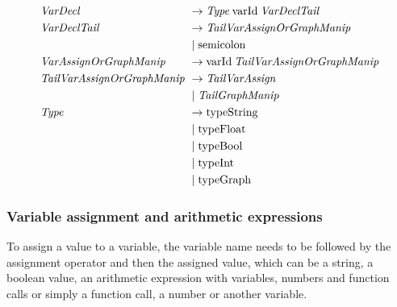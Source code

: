 \begin{align*}
    \omit $\mathit{VarDecl}$ \hfil& \rightarrow \mathit{Type} \: \text{varId} \: \mathit{VarDeclTail} \\
    \omit $\mathit{VarDeclTail}$ \hfil & \rightarrow \mathit{TailVarAssignOrGraphManip} \\
    & \mid \text{semicolon} \\
    \omit $\mathit{VarAssignOrGraphManip}$\hfil & \rightarrow \text{varId} \: \mathit{TailVarAssignOrGraphManip} \\
    \omit $\mathit{TailVarAssignOrGraphManip}$ & \rightarrow \mathit{TailVarAssign} \\
    & \mid  \mathit{TailGraphManip}\ \\
    \omit $\mathit{Type}$ \hfil & \rightarrow \text{typeString} \\
    & \mid \text{typeFloat} \\
    & \mid \text{typeBool} \\
    & \mid \text{typeInt}\\
    & \mid \text{typeGraph} \\
\end{align*} 

\subsubsection*{Variable assignment and arithmetic expressions}
To assign a value to a variable, the variable name needs to be followed by the assignment operator and then the assigned value, which can be a string, a boolean value, an arithmetic expression with variables, numbers and function calls or simply a function call, a number or another variable.

